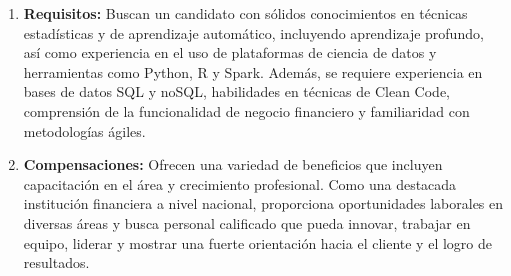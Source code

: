 \documentclass[12pt]{article}
\begin{document}
\begin{enumerate}
                    \item \textbf{Requisitos:}
                        Buscan un candidato con sólidos conocimientos en técnicas estadísticas y de aprendizaje automático, incluyendo aprendizaje profundo, así como experiencia en el uso de plataformas de ciencia de datos y herramientas como Python, R y Spark. Además, se requiere experiencia en bases de datos SQL y noSQL, habilidades en técnicas de Clean Code, comprensión de la funcionalidad de negocio financiero y familiaridad con metodologías ágiles.

                    \item \textbf{Compensaciones:}
                        Ofrecen una variedad de beneficios que incluyen capacitación en el área y crecimiento profesional. Como una destacada institución financiera a nivel nacional, proporciona oportunidades laborales en diversas áreas y busca personal calificado que pueda innovar, trabajar en equipo, liderar y mostrar una fuerte orientación hacia el cliente y el logro de resultados.

                \end{enumerate}

                
\end{document}
